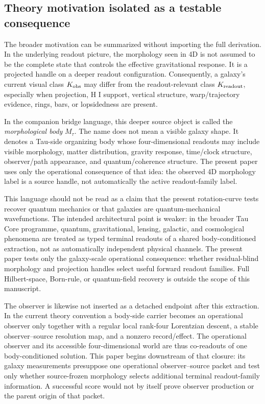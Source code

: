 \documentclass[11pt]{article}
\begin{document}
\subsection{Theory motivation isolated as a testable consequence}

The broader motivation can be summarized without importing the full derivation.
In the underlying readout picture, the morphology seen in 4D is not assumed to
be the complete state that controls the effective gravitational response.  It is
a projected handle on a deeper readout configuration.  Consequently, a galaxy's
current visual class \(K_{\rm obs}\) may differ from the readout-relevant class
\(K_{\rm readout}\), especially when projection, H I support, vertical
structure, warp/trajectory evidence, rings, bars, or lopsidedness are present.

In the companion bridge language, this deeper source object is called the
\emph{morphological body} \(M_\tau\).  The name does not mean a visible galaxy shape.
It denotes a Tau-side organizing body whose four-dimensional readouts may
include visible morphology, matter distribution, gravity response, time/clock
structure, observer/path appearance, and quantum/coherence structure.  The
present paper uses only the operational consequence of that idea: the observed
4D morphology label is a source handle, not automatically the active
readout-family label.

This language should not be read as a claim that the present rotation-curve
tests recover quantum mechanics or that galaxies are quantum-mechanical
wavefunctions.  The intended architectural point is weaker: in the broader Tau
Core programme, quantum, gravitational, lensing, galactic, and cosmological
phenomena are treated as typed terminal readouts of a shared body-conditioned
extraction, not as automatically independent physical channels.  The present paper tests only the galaxy-scale
operational consequence: whether residual-blind morphology and projection
handles select useful forward readout families.  Full Hilbert-space, Born-rule,
or quantum-field recovery is outside the scope of this manuscript.

The observer is likewise not inserted as a detached endpoint after this
extraction.  In the current theory convention a body-side carrier becomes an
operational observer only together with a regular local rank-four Lorentzian
descent, a stable observer--source resolution map, and a nonzero record/effect.
The operational observer and its accessible four-dimensional world are thus
co-readouts of one body-conditioned solution.  This paper begins downstream of
that closure: its galaxy measurements presuppose one operational
observer--source packet and test only whether source-frozen morphology selects
additional terminal readout-family information.  A successful score would not
by itself prove observer production or the parent origin of that packet.
\end{document}
